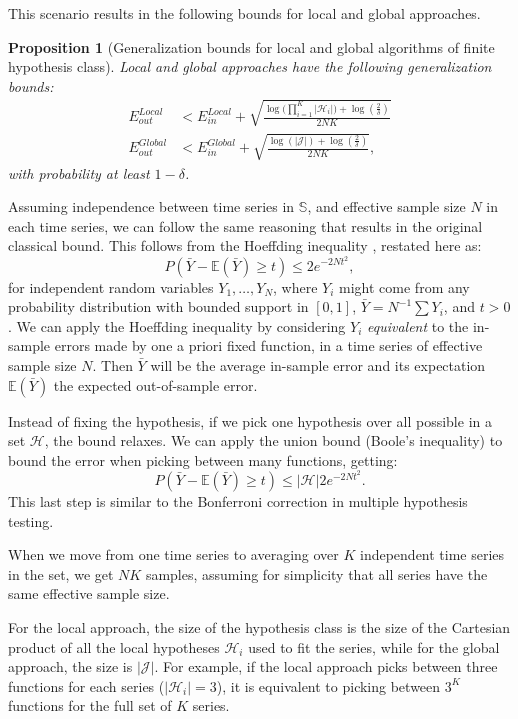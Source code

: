 \documentclass[a4paper]{article}
\theoremstyle{custom}
\newtheorem{proposition}{Proposition}
\begin{document}
This scenario results in the following bounds for local and global approaches.

\begin{proposition}[Generalization bounds for local and global algorithms of finite hypothesis class]

Local and global approaches have the following generalization bounds:
\begin{align*}
  E_{\textit{out}}^{\textit{Local}} &< E_{\textit{in}}^{\textit{Local}} +  \sqrt{ \frac{\log\big(\prod_{i=1}^K|\mathcal{H}_i |\big) + \log(\frac{2}{\delta})}{2NK}} \\
  E_{\textit{out}}^{\textit{Global}} &< E_{\textit{in}}^{\textit{Global}} +  \sqrt{ \frac{\log(|{\mathcal{J}}|) + \log(\frac{2}{\delta})}{2NK}},
\end{align*}
with probability at least $1 - \delta$.
\end{proposition}

Assuming independence between time series in $\mathbb{S}$, and effective sample size $N$ in each time series, we can follow the same reasoning that results in the original classical bound. This follows from the Hoeffding inequality \cite{hoeffding1963inequality}, restated here as:
$$
  P(\bar{Y} - \mathbb{E}(\bar{Y}) \geq t ) \leq 2e^{-2Nt^2},
$$
for independent random variables $Y_1,\dots,Y_N$, where $Y_i$ might come from any probability distribution with bounded support in $[0,1]$, $\bar{Y} = N^{-1}\sum Y_i$, and $t > 0$. We can apply the Hoeffding inequality by considering $Y_i$ \textit{equivalent} to the in-sample errors made by one a priori fixed function, in a time series of effective sample size $N$. Then $\bar{Y}$ will be the average in-sample error and its expectation $\mathbb{E}(\bar{Y})$ the expected out-of-sample error.

Instead of fixing the hypothesis, if we pick one hypothesis over all possible in a set $\mathcal{H}$, the bound relaxes. We can apply the union bound (Boole's inequality) to bound the error when picking between many functions, getting:
$$
  P(\bar{Y} - \mathbb{E}(\bar{Y}) \geq t ) \leq |\mathcal{H}|2e^{-2Nt^2}.
$$
This last step is similar to the Bonferroni correction in multiple hypothesis testing.

When we move from one time series to averaging over $K$ independent time series in the set, we get $NK$ samples, assuming for simplicity that all series have the same effective sample size.

For the local approach, the size of the hypothesis class is the size of the Cartesian product of all the local hypotheses $\mathcal{H}_i$ used to fit the series, while for the global approach, the size is $|{\mathcal{J}}|$.
For example, if the local approach picks between three functions for each series ($|\mathcal{H}_i|=3$), it is equivalent to picking between $3^K$ functions for the full set of $K$ series.
\end{document}
